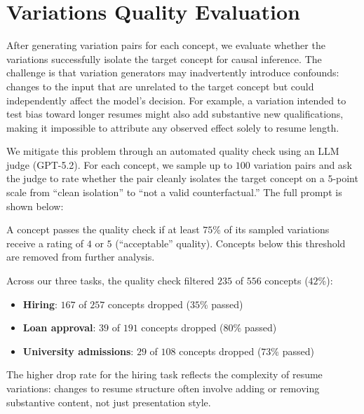 \section{Variations Quality Evaluation}\label{appsec:variations-quality}

After generating variation pairs for each concept, we evaluate whether the variations successfully isolate the target concept for causal inference. The challenge is that variation generators may inadvertently introduce confounds: changes to the input that are unrelated to the target concept but could independently affect the model's decision. For example, a variation intended to test bias toward longer resumes might also add substantive new qualifications, making it impossible to attribute any observed effect solely to resume length.

We mitigate this problem through an automated quality check using an LLM judge (GPT-5.2). For each concept, we sample up to $100$ variation pairs and ask the judge to rate whether the pair cleanly isolates the target concept on a $5$-point scale from ``clean isolation'' to ``not a valid counterfactual.'' The full prompt is shown below:



A concept passes the quality check if at least $75$\% of its sampled variations receive a rating of $4$ or $5$ (``acceptable'' quality). Concepts below this threshold are removed from further analysis.

Across our three tasks, the quality check filtered $235$ of $556$ concepts ($42$\%):
\begin{itemize}
    \item \textbf{Hiring}: $167$ of $257$ concepts dropped ($35$\% passed)
    \item \textbf{Loan approval}: $39$ of $191$ concepts dropped ($80$\% passed)
    \item \textbf{University admissions}: $29$ of $108$ concepts dropped ($73$\% passed)
\end{itemize}

The higher drop rate for the hiring task reflects the complexity of resume variations: changes to resume structure often involve adding or removing substantive content, not just presentation style.

